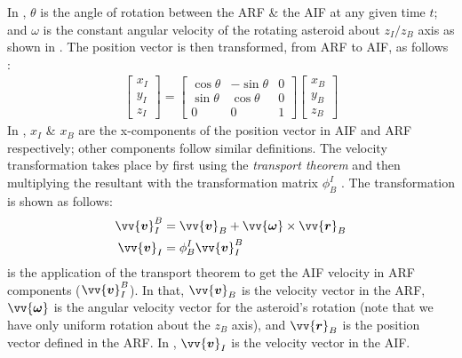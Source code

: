 In , $\theta$ is the angle of rotation between the \gls{ARF} \& the \gls{AIF} at any given time $t$; and $\omega$ is the constant angular velocity of the rotating asteroid about $z_I / z_B$ axis as shown in . The position vector is then transformed, from \gls{ARF} to \gls{AIF}, as follows \parencite{schaub2003Book}:
\begin{align}
    \begin{bmatrix}
        x_I \\
        y_I \\
        z_I
    \end{bmatrix}
    =
    \begin{bmatrix}
        \cos\theta & -\sin\theta & 0 \\
        \sin\theta & \cos\theta & 0 \\
        0 & 0 & 1
    \end{bmatrix}
    \begin{bmatrix}
        x_B \\
        y_B \\
        z_B
    \end{bmatrix}
    \label{eqn:arf_to_aif_position_transformation}
\end{align}
In , $x_I$ \& $x_B$ are the x-components of the position vector in \gls{AIF} and \gls{ARF} respectively; other components follow similar definitions. The velocity transformation takes place by first using the \textit{transport theorem} and then multiplying the resultant with the transformation matrix $\phi_{B}^{I}$ \parencite{schaub2003Book}. The transformation is shown as follows:
\begin{align}
    \vv{\bm{v}}_{I}^{B} &= \vv{\bm{v}}_{B} + \vv{\bm{\omega}} \times \vv{\bm{r}}_{B}
    \label{eqn:arf_to_aif_transport_theorem} \\
    \vv{\bm{v}}_I &= \phi_B^I \vv{\bm{v}}_I^B
    \label{eqn:arf_to_aif_velocity_transformation}
\end{align}
 is the application of the transport theorem to get the \gls{AIF} velocity in \gls{ARF} components ($\vv{\bm{v}}_{I}^{B}$). In that, $\vv{\bm{v}}_{B}$ is the velocity vector in the \gls{ARF}, $\vv{\bm{\omega}}$ is the angular velocity vector for the asteroid's rotation (note that we have only uniform rotation about the $z_B$ axis), and $\vv{\bm{r}}_{B}$ is the position vector defined in the \gls{ARF}. In , $\vv{\bm{v}}_I$ is the velocity vector in the \gls{AIF}.
